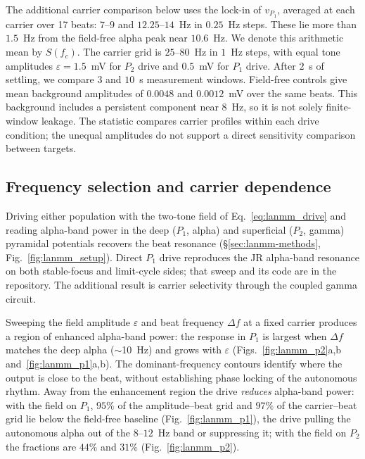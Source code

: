\documentclass[11pt,a4paper]{article}
\begin{document}
The additional carrier comparison below uses the lock-in
of $v_{P_1}$, averaged at each carrier over 17 beats: $7$--$9$ and
$12.25$--$14$~Hz in $0.25$~Hz steps. These lie more than $1.5$~Hz from the
field-free alpha peak near $10.6$~Hz. We denote this arithmetic mean by $S(f_c)$.
The carrier grid is $25$--$80$~Hz in $1$~Hz steps, with equal tone amplitudes
$\varepsilon=1.5$~mV for $P_2$ drive and $0.5$~mV for $P_1$ drive. After $2$~s
of settling, we compare $3$ and $10$~s measurement windows. Field-free controls
give mean background amplitudes of $0.0048$ and $0.0012$~mV over the same beats.
This background includes a persistent component near $8$~Hz, so it is not solely
finite-window leakage. The statistic compares carrier profiles within each drive
condition; the unequal amplitudes do not support a direct sensitivity comparison
between targets.

\subsection{Frequency selection and carrier dependence}\label{sec:lanmm-results}
Driving either population with the two-tone field of Eq.~\eqref{eq:lanmm_drive}
and reading alpha-band power in the deep ($P_1$, alpha) and superficial ($P_2$,
gamma) pyramidal potentials recovers the beat resonance
(\S\ref{sec:lanmm-methods}, Fig.~\ref{fig:lanmm_setup}). Direct $P_1$ drive reproduces the JR
alpha-band resonance on both stable-focus and limit-cycle sides; that sweep
and its code are in the repository. The additional result is carrier selectivity
through the coupled gamma circuit.

Sweeping the field amplitude $\varepsilon$ and beat frequency $\Delta f$ at a fixed
carrier produces a region of enhanced alpha-band power: the response in $P_1$ is largest
when $\Delta f$ matches the deep alpha ($\sim$10~Hz) and grows with $\varepsilon$
(Figs.~\ref{fig:lanmm_p2}a,b and~\ref{fig:lanmm_p1}a,b). The dominant-frequency
contours identify where the output is close to the beat, without establishing
phase locking of the autonomous rhythm. Away from the enhancement region the drive
\emph{reduces} alpha-band power: with the field on $P_1$, $95\%$ of the amplitude--beat
grid and $97\%$ of the carrier--beat grid lie below the field-free baseline
(Fig.~\ref{fig:lanmm_p1}), the drive pulling the autonomous alpha out of the $8$--$12$~Hz
band or suppressing it; with the field on $P_2$ the fractions are $44\%$ and $31\%$
(Fig.~\ref{fig:lanmm_p2}).
\end{document}
